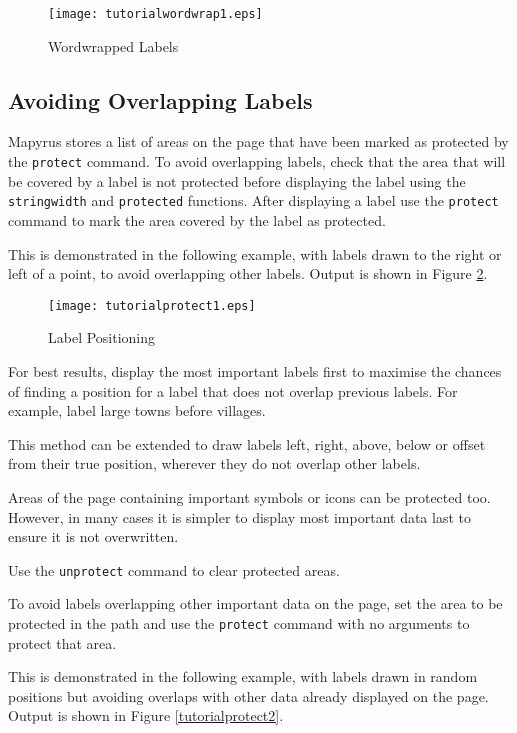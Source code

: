 

\begin{figure}[htb]
\texttt{[image: tutorialwordwrap1.eps]}
\caption{Wordwrapped Labels}
\label{tutorialwordwrap1}
\end{figure}

\subsection{Avoiding Overlapping Labels}

Mapyrus stores a list of
areas on the page that have been marked as protected by the
\texttt{protect} command.
To avoid overlapping labels, check that the area that will be
covered by a label is not protected before displaying the
label using the \texttt{stringwidth} and \texttt{protected} functions.
After displaying a label use the \texttt{protect} command to mark
the area covered by the label as protected.

This is demonstrated in the following example, with labels
drawn to the right or left of a point, to avoid overlapping
other labels.
Output is shown in Figure \ref{tutorialprotect1}.



\begin{figure}[htb]
\texttt{[image: tutorialprotect1.eps]}
\caption{Label Positioning}
\label{tutorialprotect1}
\end{figure}

For best results, display the most important labels first to maximise the
chances of finding a position for a label that does not overlap previous
labels.  For example, label large towns before villages.

This method can be extended to draw labels left, right, above, below or offset
from their true position, wherever they do not overlap other labels.

Areas of the page containing important symbols or icons can be
protected too.  However, in many cases it is simpler to
display most important data last to ensure it is not overwritten.

Use the \texttt{unprotect} command to clear protected areas.

To avoid labels overlapping other important data on the page, set the
area to be protected in the path and use
the \texttt{protect} command with no arguments to protect that area.

This is demonstrated in the following example, with labels
drawn in random positions but avoiding overlaps with other data
already displayed on the page.
Output is shown in Figure \ref{tutorialprotect2}.

